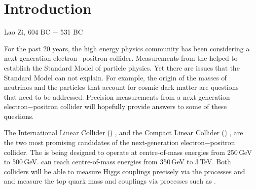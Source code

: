 \chapter{Introduction}
\label{chap:Introduction}



%
{Lao Zi, 604 BC $-$ 531 BC}%

For the past 20 years, the high energy physics community has been considering a next-generation electron$-$positron collider. Measurements from the \LHC helped to establish the Standard Model of particle physics. Yet there are issues that the Standard Model can not explain. For example, the origin of the masses of neutrinos and the particles that account for cosmic dark matter are questions that need to be addressed. Precision measurements from a next-generation electron$-$positron collider will hopefully provide answers to some of these questions.


The International Linear Collider (\ILC)  \cite{Brau:2007zza}, and the Compact Linear Collider (\CLIC) \cite{Linssen:2012hp}, are the  two most promising candidates of the next-generation electron$-$positron collider. The \ILC is being designed to operate at centre-of-mass energies from 250\,GeV to 500\,GeV. \CLIC can reach centre-of-mass energies from 350\,GeV to 3\,TeV. Both colliders will be able to measure Higgs couplings precisely via the processes  \HepProcess{\ee \to \PZ \PHiggs} and \HepProcess{\ee \to \PHiggs \Pneutrino \Pneutrino} and measure the top quark mass and couplings via processes such as \HepProcess{\ee \to \Ptop \APtop}.

